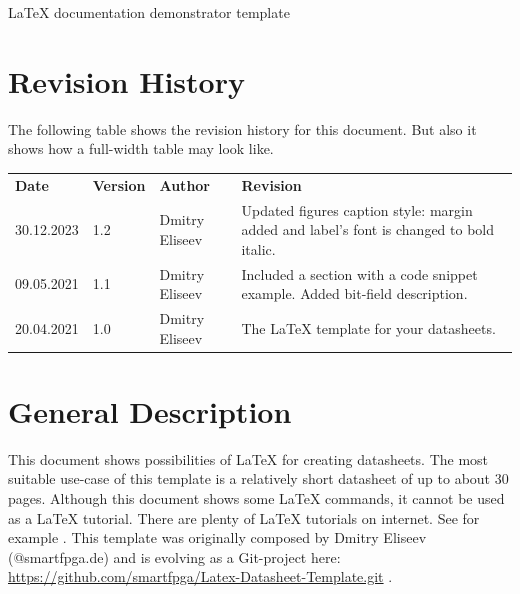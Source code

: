 \documentclass[a4paper, 10pt, onecolumn]{article}
\newcommand {\documentname}{LaTeX documentation demonstrator template}
\def\widehline{%
\noalign{\global\dimen1 \arrayrulewidth
\global\arrayrulewidth3\arrayrulewidth}%
\hline
\noalign{\global\arrayrulewidth\dimen1 }}
\newcommand{\chline}{%
    \arrayrulecolor{burgund}\widehline\arrayrulecolor{gray25}
}
\begin{document}
\thispagestyle{title}

\begin{flushleft}
\huge \documentname
\normalsize
\end{flushleft}

\section*{Revision History}
The following table shows the revision history for this document. But also it shows how a full-width table may look like.

\begin{table}[H]
\label{tab:revhist}
\centering\bgroup
\def\arraystretch{1.5}
\begin{tabularx}{\textwidth}{|l|l|l|X|}
    \hline
    \textbf{Date} & \textbf{Version} & \textbf{Author} & \textbf{Revision} \\ \chline
    30.12.2023 & 1.2 & Dmitry Eliseev & Updated figures caption style: margin added and label's font is changed to bold italic. \\ \hline
    09.05.2021 & 1.1 & Dmitry Eliseev & Included a section with a code snippet example. Added bit-field description.\\ \hline
    20.04.2021 & 1.0 & Dmitry Eliseev & The LaTeX template for your datasheets.\\ \hline
\end{tabularx}
\egroup
\end{table}

\section*{General Description}
This document shows possibilities of LaTeX for creating datasheets. 
The most suitable use-case of this template is a relatively short datasheet of up to about 30 pages.
Although this document shows some LaTeX commands, it cannot be used as a LaTeX tutorial.
There are plenty of LaTeX tutorials on internet.
See for example \cite{LatexTutorial}.
This template was originally composed by Dmitry Eliseev (@smartfpga.de) and is evolving as a Git-project here: \url{https://github.com/smartfpga/Latex-Datasheet-Template.git} \cite{GithubLink}.
\end{document}
